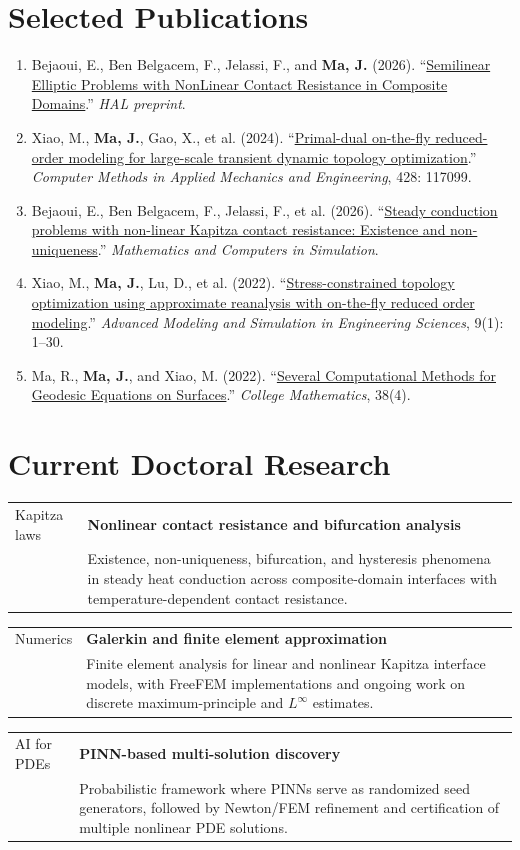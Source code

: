 \documentclass[8pt,a4paper]{extarticle}
\makeatletter
\newcommand{\cvitem}[4]{%
  \begin{tabularx}{\textwidth}{@{}p{1.85cm}X@{}}
    {\color{lightgray}\small #1} &
    \textbf{#2}{\color{lightgray}\small\quad #3}\\
    & {\color{textgray}\small #4}
  \end{tabularx}\vspace{0.1em}
}
\newcommand{\publication}[1]{%
  \item \small #1
}
\makeatother
\begin{document}
\section{Selected Publications}
\begin{enumerate}[leftmargin=1.25em,itemsep=0.08em,topsep=0.05em]
  \publication{Bejaoui, E., Ben Belgacem, F., Jelassi, F., and \textbf{Ma, J.} (2026). ``\href{https://hal.science/hal-05659943/}{Semilinear Elliptic Problems with NonLinear Contact Resistance in Composite Domains}.'' \emph{HAL preprint}.}
  \publication{Xiao, M., \textbf{Ma, J.}, Gao, X., et al. (2024). ``\href{https://www.sciencedirect.com/science/article/abs/pii/S0045782524003554}{Primal-dual on-the-fly reduced-order modeling for large-scale transient dynamic topology optimization}.'' \emph{Computer Methods in Applied Mechanics and Engineering}, 428: 117099.}
  \publication{Bejaoui, E., Ben Belgacem, F., Jelassi, F., et al. (2026). ``\href{https://www.sciencedirect.com/science/article/abs/pii/S0378475426001412}{Steady conduction problems with non-linear Kapitza contact resistance: Existence and non-uniqueness}.'' \emph{Mathematics and Computers in Simulation}.}
  \publication{Xiao, M., \textbf{Ma, J.}, Lu, D., et al. (2022). ``\href{https://link.springer.com/article/10.1186/s40323-022-00231-x}{Stress-constrained topology optimization using approximate reanalysis with on-the-fly reduced order modeling}.'' \emph{Advanced Modeling and Simulation in Engineering Sciences}, 9(1): 1--30.}
  \publication{Ma, R., \textbf{Ma, J.}, and Xiao, M. (2022). ``\href{https://oversea.cnki.net/kcms2/article/abstract?v=LT90ZeEa8UwbksutCtpkiH8n2MicjbHp7UYFYuBYrLHTggjfv7ub-JIpMhSO9hROAk_nWyIonQfayeRYKh2LncloVAubuLFCe5kkkCw8erW2pL-yD0FmZ5tEcz8cvhd4ZjbXycvS32uSWVs54lZBiY7Li5mfpiygmzhNThPnBOjBgIBcWbGC-w==&uniplatform=OVERSEA&language=EN}{Several Computational Methods for Geodesic Equations on Surfaces}.'' \emph{College Mathematics}, 38(4).}
\end{enumerate}

\section{Current Doctoral Research}
\cvitem{Kapitza laws}{Nonlinear contact resistance and bifurcation analysis}{}{Existence, non-uniqueness, bifurcation, and hysteresis phenomena in steady heat conduction across composite-domain interfaces with temperature-dependent contact resistance.}
\cvitem{Numerics}{Galerkin and finite element approximation}{}{Finite element analysis for linear and nonlinear Kapitza interface models, with FreeFEM implementations and ongoing work on discrete maximum-principle and $L^\infty$ estimates.}
\cvitem{AI for PDEs}{PINN-based multi-solution discovery}{}{Probabilistic framework where PINNs serve as randomized seed generators, followed by Newton/FEM refinement and certification of multiple nonlinear PDE solutions.}
\end{document}
